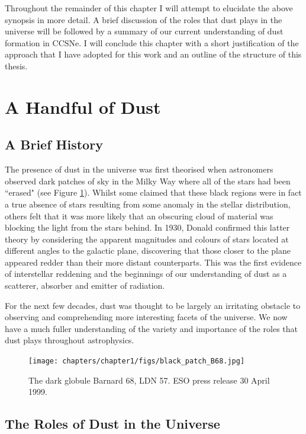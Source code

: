 Throughout the remainder of this chapter I will attempt to elucidate the above synopsis in more detail.  A brief discussion of the roles that dust plays in the universe will be followed by a summary of our current understanding of dust formation in CCSNe.  I will conclude this chapter with a short justification of the approach that I have adopted for this work and an outline of the structure of this thesis.


\section{A Handful of Dust}


\subsection{A Brief History}

The presence of dust in the universe was first theorised when astronomers observed dark patches of sky in the Milky Way where all of the stars had been ``erased" (see Figure \ref{intro:fig:dustpatch}).  Whilst some claimed that these black regions were in fact a true absence of stars resulting from some anomaly in the stellar distribution, others felt that it was more likely that an obscuring cloud of material was blocking the light from the stars behind.  In 1930, Donald \citeauthor{Trumpler1930} confirmed this latter theory by considering the apparent magnitudes and colours of stars located at different angles to the galactic plane, discovering that those closer to the plane appeared redder than their more distant counterparts.  This was the first evidence of interstellar reddening and the beginnings of our understanding of dust as a scatterer, absorber and emitter of radiation.

For the next few decades, dust was thought to be largely an irritating obstacle to observing and comprehending more interesting facets of the universe.  We now have a much fuller understanding of the variety and importance of the roles that dust plays throughout astrophysics.

\begin{figure}
\centering
\texttt{[image: chapters/chapter1/figs/black\_patch\_B68.jpg]}
\caption{The dark globule Barnard 68, LDN 57.  ESO press release 30 April 1999.}
\label{intro:fig:dustpatch}
\end{figure}

\subsection{The Roles of Dust in the Universe}

